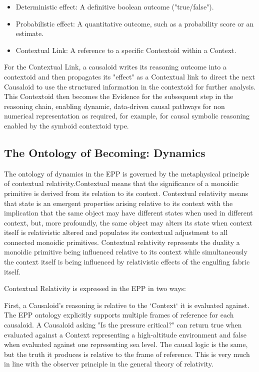 \begin{itemize}
	\item Deterministic effect: A definitive boolean outcome ("true/false").
	\item Probabilistic effect: A quantitative outcome, such as a probability score or an estimate.
	\item  Contextual Link: A reference to a specific Contextoid within a Context.
\end{itemize}

For the Contextual Link,  a causaloid writes its reasoning outcome into a contextoid and then propagates its "effect" as a Contextual link to direct the next Causaloid to use the structured information in the contextoid for further analysis. This Contextoid then becomes the Evidence for the subsequent step in the reasoning chain, enabling dynamic, data-driven causal pathways for non numerical representation as required, for example, for causal symbolic reasoning enabled by the symboid contextoid type. 

\subsection{The Ontology of Becoming: Dynamics}
\label{sec:ontology_dynamics}

The ontology of dynamics in the EPP is governed by the metaphysical principle of contextual relativity.Contextual means that the significance of a monoidic primitive is derived from its relation to its context. Contextual relativity means that state is an emergent properties arising relative to its context with the implication that the same object may have different states when used in different context, but, more profoundly, the same object may alters its state when context itself is relativistic altered and populates its contextual adjustment to all connected monoidic primitives. 
Contextual relativity represents the duality a monoidic primitive being influenced relative to its context while simultaneously the context itself is being influenced by relativistic effects of the engulfing fabric itself. 

Contextual Relativity is expressed in the EPP in two ways:

First, a Causaloid's reasoning is relative to the `Context` it is evaluated against. The EPP ontology explicitly supports multiple frames of reference for each causaloid. A Causaloid asking "Is the pressure critical?" can return true when evaluated against a Context representing a high-altitude environment and false when evaluated against one representing sea level. The causal logic is the same, but the truth it produces is relative to the frame of reference. This is very much in line with the observer principle in the general theory of relativity. 


